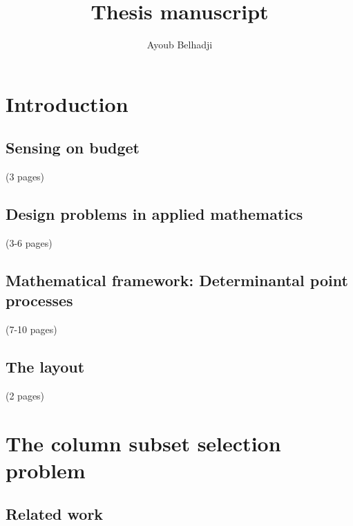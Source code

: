 \documentclass[twoside,11pt]{article}
\begin{document}
\title{Thesis manuscript}


\author{Ayoub Belhadji} %
 
\maketitle






\newpage
\section{Introduction}
\subsection{Sensing on budget} 
(3 pages)
\subsection{Design problems in applied mathematics}
(3-6 pages)
\subsection{Mathematical framework: Determinantal point processes}
(7-10 pages)

\subsection{The layout}
(2 pages)
\section{The column subset selection problem}\label{chapter:cssp}
\subsection{Related work}
\end{document}
